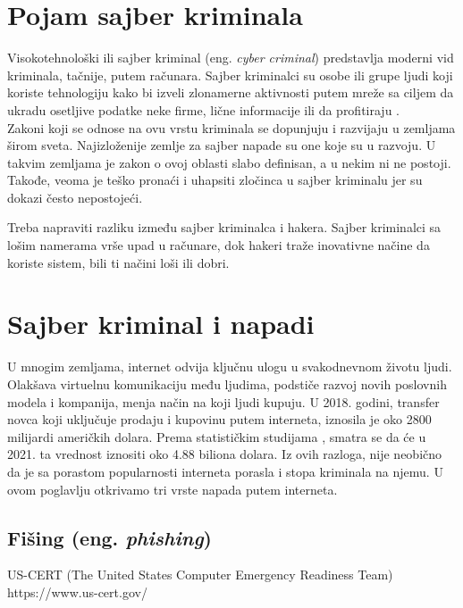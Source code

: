 \documentclass[a4paper]{article}
\begin{document}
\section{Pojam sajber kriminala}
\label{pojam}

Visokotehnološki ili sajber kriminal (eng. {\em cyber criminal}) predstavlja moderni vid kriminala, tačnije, putem računara. Sajber kriminalci su osobe ili grupe ljudi koji koriste tehnologiju kako bi izveli zlonamerne aktivnosti putem mreže sa ciljem da ukradu osetljive podatke neke firme, lične informacije ili da profitiraju \cite{sajber}.
\\Zakoni koji se odnose na ovu vrstu kriminala se dopunjuju i razvijaju u zemljama širom sveta. Najizloženije zemlje za sajber napade su one koje su u razvoju. U takvim zemljama je zakon o ovoj oblasti slabo definisan, a u nekim ni ne postoji. Takođe, veoma je teško pronaći i uhapsiti zločinca u sajber kriminalu jer su dokazi često nepostojeći.

Treba napraviti razliku između sajber kriminalca i hakera. Sajber kriminalci sa lošim namerama vrše upad u računare, dok hakeri traže inovativne načine da koriste sistem, bili ti načini loši ili dobri.
\\

 

\section{Sajber kriminal i napadi}

\label{sec:kriminal_napadi}

U mnogim zemljama, internet odvija ključnu ulogu u svakodnevnom životu ljudi. Olakšava virtuelnu komunikaciju među ljudima, podstiče razvoj novih poslovnih modela i kompanija, menja način na koji ljudi kupuju. U 2018. godini, transfer novca koji uključuje prodaju i kupovinu putem interneta, iznosila je oko 2800 milijardi američkih dolara. Prema statističkim studijama \cite{statistika}, smatra se da će u 2021. ta vrednost iznositi oko 4.88 biliona dolara. Iz ovih razloga, nije neobično da je sa porastom popularnosti interneta porasla i stopa kriminala na njemu. U ovom poglavlju otkrivamo tri vrste napada putem interneta.

\subsection{Fišing (eng. {\em phishing})}
\label{subsec:phishing}

US-CERT (The United States Computer Emergency Readiness Team)
https://www.us-cert.gov/
\end{document}
